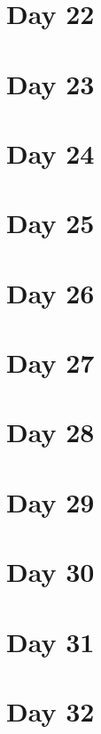 \documentclass[]{book}
\begin{document}
\hypertarget{day-22}{%
\chapter{Day 22}\label{day-22}}

\hypertarget{day-23}{%
\chapter{Day 23}\label{day-23}}

\hypertarget{day-24}{%
\chapter{Day 24}\label{day-24}}

\hypertarget{day-25}{%
\chapter{Day 25}\label{day-25}}

\hypertarget{day-26}{%
\chapter{Day 26}\label{day-26}}

\hypertarget{day-27}{%
\chapter{Day 27}\label{day-27}}

\hypertarget{day-28}{%
\chapter{Day 28}\label{day-28}}

\hypertarget{day-29}{%
\chapter{Day 29}\label{day-29}}

\hypertarget{day-30}{%
\chapter{Day 30}\label{day-30}}

\hypertarget{day-31}{%
\chapter{Day 31}\label{day-31}}

\hypertarget{day-32}{%
\chapter{Day 32}\label{day-32}}
\end{document}
